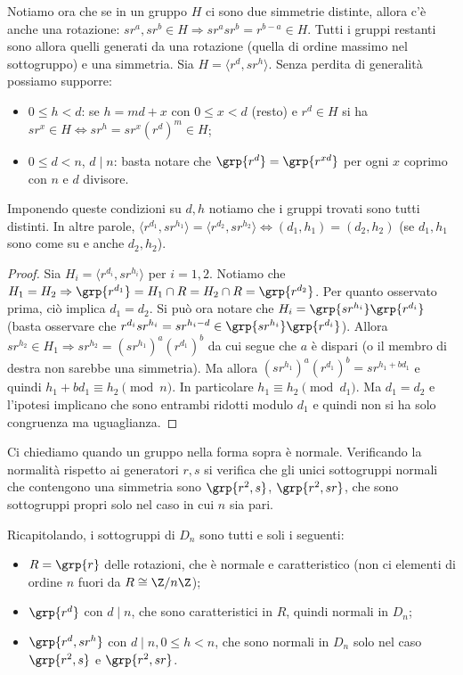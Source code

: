 Notiamo ora che se in un gruppo $H$ ci sono due simmetrie distinte, allora c'è anche una rotazione: $sr^a, sr^b \in H \Rightarrow sr^asr^b = r^{b-a} \in H$. Tutti i gruppi restanti sono allora quelli generati da una rotazione (quella di ordine massimo nel sottogruppo) e una simmetria. Sia $H = \langle r^d, sr^h \rangle$. Senza perdita di generalità possiamo supporre:
\begin{itemize}
    \item $0 \leq h < d$: se $h = md + x$ con $0 \leq x < d$ (resto) e $r^d \in H$ si ha $sr^x\in H \iff sr^h = sr^x(r^d)^m \in H$;
    \item $0 \leq d < n$, $d \mid n$: basta notare che $\grp{r^d} = \grp{r^{xd}}$ per ogni $x$ coprimo con $n$ e $d$ divisore.
\end{itemize}
Imponendo queste condizioni su $d,h$ notiamo che i gruppi trovati sono tutti distinti. In altre parole, $\langle r^{d_1}, sr^{h_1} \rangle = \langle r^{d_2}, sr^{h_2} \rangle \iff (d_1,h_1) = (d_2,h_2)$ (se $d_1,h_1$ sono come su e anche $d_2,h_2$).
\begin{proof}
    Sia $H_i = \langle r^{d_i}, sr^{h_i} \rangle$ per $i = 1,2$. Notiamo che $H_1 = H_2 \Rightarrow \grp{r^{d_1}} = H_1 \cap R = H_2 \cap R = \grp{r^{d_2}}$. Per quanto osservato prima, ciò implica $d_1 = d_2$. Si può ora notare che $H_i = \grp{sr^{h_i}}\grp{r^{d_i}}$ (basta osservare che $r^{d_i}sr^{h_i}=sr^{h_i-d} \in \grp{sr^{h_i}}\grp{r^{d_i}}$). Allora $sr^{h_2} \in H_1  \Rightarrow sr^{h_2} = (sr^{h_1})^a(r^{d_1})^b$ da cui segue che $a$ è dispari (o il membro di destra non sarebbe una simmetria). Ma allora $(sr^{h_1})^a(r^{d_1})^b=sr^{h_1+bd_1}$ e quindi $h_1 + b d_1  \equiv h_2 \pmod{n}$. In particolare $h_1 \equiv h_2 \pmod{d_1}$. Ma $d_1 = d_2$ e l'ipotesi implicano che sono entrambi ridotti modulo $d_1$ e quindi non si ha solo congruenza ma uguaglianza.
\end{proof}
Ci chiediamo quando un gruppo nella forma sopra è normale. Verificando la normalità rispetto ai generatori $r,s$ si verifica che gli unici sottogruppi normali che contengono una simmetria sono $\grp{r^2, s}$, $\grp{r^2, sr}$, che sono sottogruppi propri solo nel caso in cui $n$ sia pari.

Ricapitolando, i sottogruppi di $D_n$ sono tutti e soli i seguenti:
\begin{itemize}
    \item $R = \grp{r}$ delle rotazioni, che è normale e caratteristico (non ci elementi di ordine $n$ fuori da $R\cong \Z/n\Z$);
    \item $\grp{r^d}$ con $d\mid n$, che sono caratteristici in $R$, quindi normali in $D_n$;
    \item $\grp{r^d, sr^h}$ con $d \mid n, 0\leq h < n$, che sono normali in $D_n$ solo nel caso $\grp{r^2, s}$ e $\grp{r^2, sr}$.
\end{itemize}

